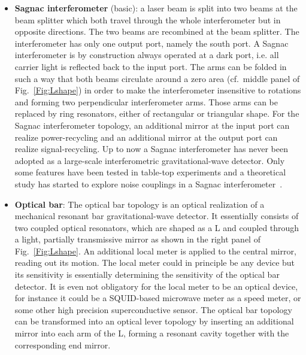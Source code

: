 {\begin{itemize}
then also called the bright port of the interferometer. A
power-recycling mirror can be positioned at the bright port in
such a way that it forms a resonant cavity for the carrier light
together with the mirrors of the two interferometer arms.
Furthermore, each interferometer arm can be replaced by equal
Fabry-Perot cavities, formed by an input mirror and an
end mirror. An additional mirror can also be placed at the
interferometer's south port, known as the signal-recycling mirror.
Another possibility is to send the output signal at the west port
into an additional resonator, a so-called sloshing cavity.
Furthermore, polarizing optics can be used in order to send the
beam back into the interferometer. The Michelson interferometer is
the standard topology for interferometric gravitational-wave
detectors. The great advantage of this configuration is that there is a lot of
experience gathered.
\item  {\bf Sagnac interferometer} (basic): a laser beam is split
into two beams at the beam splitter which both travel through the
whole interferometer but in opposite directions. The two beams are
recombined at the beam splitter. The interferometer has only one
output port, namely the south port. A Sagnac
interferometer is by construction always operated at a dark port, i.e.
all carrier light is reflected back to the input port. The
arms can be folded in such a way that both beams circulate around
a zero area (cf.\ middle panel of Fig.~\ref{Fig:Lshape}) in order
to make the interferometer insensitive to rotations and forming
two perpendicular interferometer arms. Those arms can be replaced
by ring resonators, either of rectangular or triangular shape. For
the Sagnac interferometer topology, an additional mirror at the
input port can realize power-recycling and an additional mirror
at the output port can realize signal-recycling. Up to now a
Sagnac interferometer has never been adopted as a large-scale
interferometric gravitational-wave detector. Only some features
have been tested in table-top experiments and a theoretical study
has started to explore noise couplings in a Sagnac
interferometer~\cite{Chelkowski}.
\item {\bf Optical bar}: The optical bar topology is an optical
realization of a mechanical resonant bar gravitational-wave
detector. It essentially consists of two coupled optical
resonators, which are shaped as a L and coupled through a light,
partially transmissive mirror as shown in the right panel of
Fig.~\ref{Fig:Lshape}. An additional local meter is applied to the
central mirror, reading out its motion. The local meter could in
principle be any device but its sensitivity is essentially
determining the sensitivity of the optical bar detector. It is
even not obligatory for the local meter to be an optical device,
for instance it could be a SQUID-based microwave meter as a speed
meter, or some other high precision superconductive sensor. The
optical bar topology can be transformed into an optical lever
topology by inserting an additional mirror into each arm of the L,
forming a resonant cavity together with the corresponding end
mirror.
\end{itemize}}

